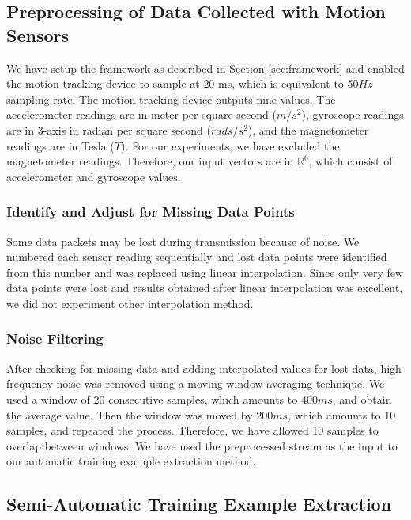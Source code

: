 \documentclass{IEEEtran}
\begin{document}
\subsection{Preprocessing of Data Collected with Motion Sensors }

We have setup the framework as described in Section \ref{sec:framework} and enabled the 
motion tracking device to sample at $20$ ms, which is equivalent to 50$Hz$ 
sampling rate. The motion tracking device outputs nine values. The  
accelerometer readings are in  meter per square second ($m/s^2$), gyroscope readings are 
in 3-axis in radian per square second ($rads/s^2$), and the magnetometer readings are  in 
Tesla ($T$). For our experiments, we have excluded the magnetometer readings. Therefore, 
our input vectors are in $\mathbb{R}^6$, which consist of accelerometer and gyroscope 
values.

\subsubsection{Identify and Adjust for Missing Data Points}
\label{sec:IdentifyAndAdjustForMissingDataPoints}
Some data packets may be lost during transmission because of noise. We numbered each sensor reading sequentially and lost data points were identified from this number and was replaced using linear interpolation. Since only very few data points were lost and results obtained after linear interpolation was excellent, we did not experiment other interpolation method.

\subsubsection{Noise Filtering}
\label{sec:NoiseFiltering}

After checking for missing data and adding interpolated values for lost data,  high frequency noise was removed using a moving window averaging technique. We used a window  of 20 consecutive samples, which amounts to 400$ms$, 
and obtain the average value. Then the  window was moved by 200$ms$, which amounts to 10 samples, and 
repeated the process. Therefore, we have allowed 10 samples to overlap between windows. 
We have used the preprocessed stream as the input to our automatic training example 
extraction method.


\subsection{Semi-Automatic Training Example Extraction}
\end{document}
